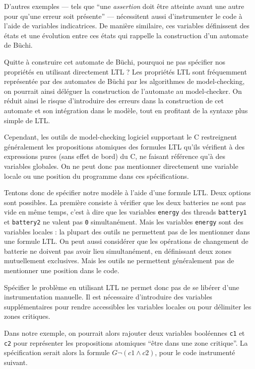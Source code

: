D'autres exemples --- tels que ``une \emph{assertion} doit être atteinte
avant une autre pour qu'une erreur soit présente'' --- nécessitent aussi
d'instrumenter le code à l'aide de variables indicatrices. De manière
similaire, ces variables définissent des états et une évolution entre
ces états qui rappelle la construction d'un automate de Büchi.

Quitte à construire cet automate de Büchi, pourquoi ne pas spécifier nos
propriétés en utilisant directement LTL ? Les propriétés LTL sont fréquemment
représentée par des automates de Büchi par les algorithmes de model-checking, on
pourrait ainsi déléguer la construction de l'automate au model-checker.
On réduit ainsi le risque d'introduire des erreurs dans la construction de cet
automate et son intégration dans le modèle, tout en profitant de la syntaxe plus
simple de LTL.

Cependant, les outils de model-checking logiciel supportant le C restreignent
généralement les propositions atomiques des formules LTL qu'ils vérifient à des
expressions pures (sans effet de bord) du C, ne faisant référence qu'à des
variables globales. On ne peut donc pas mentionner directement une variable
locale ou une position du programme dans ces spécifications.

Tentons donc de spécifier notre modèle à l'aide d'une formule LTL. Deux
options sont possibles. La première consiste à vérifier que les deux
batteries ne sont pas vide en même temps, c'est à dire que les variables
\texttt{energy} des threads \texttt{battery1} et
\texttt{battery2} ne valent pas \texttt{0} simultanément. Mais les
variables \texttt{energy} sont des variables locales : la
plupart des outils ne permettent pas de les mentionner dans une formule
LTL. On peut aussi considérer que les opérations de changement de
batterie ne doivent pas avoir lieu simultanément, en définissant deux
zones mutuellement exclusives. Mais les outils ne permettent
généralement pas de mentionner une position dans le code.

Spécifier le problème en utilisant LTL ne permet donc pas de se libérer
d'une instrumentation manuelle. Il est nécessaire d'introduire des
variables supplémentaires pour rendre accessibles les variables locales
ou pour délimiter les zones critiques.

Dans notre exemple, on pourrait alors rajouter deux variables booléennes
\texttt{c1} et \texttt{c2} pour représenter les propositions atomiques
``être dans une zone critique''. La spécification serait alors
la formule \(G \lnot (c1 \land c2)\), pour le code instrumenté suivant.

